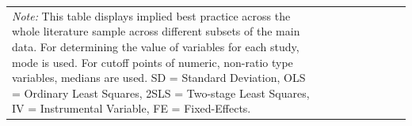 \begin{table}[!htbp]
\begin{tabular}{
@{}
l %
*{7}{c} %
>{\centering\arraybackslash}p{1cm} %
@{}
}
    \bottomrule                                               
    
\multicolumn{9}{>{\scriptsize}p{0.95\linewidth}}{\emph{Note:} This table displays implied best practice across the whole literature sample across different subsets of the main data. For determining the value of variables for each study, mode is used. For cutoff points of numeric, non-ratio type variables, medians are used. SD = Standard Deviation, OLS = Ordinary Least Squares, 2SLS = Two-stage Least Squares, IV = Instrumental Variable, FE = Fixed-Effects.}
\end{tabular}
\end{table}


